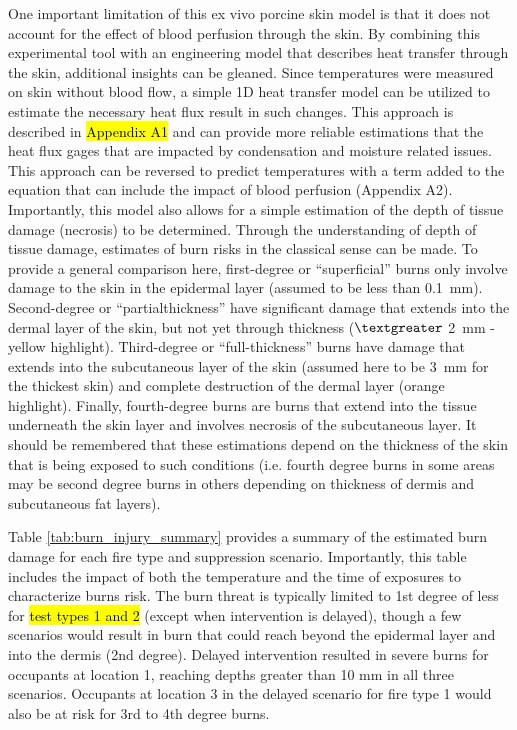 \documentclass[12pt,oneside]{book}
\begin{document}
One important limitation of this ex vivo porcine skin model is that it does not account for the effect of blood perfusion through the skin. By combining this experimental tool with an engineering model that describes heat transfer through the skin, additional insights can be gleaned.  Since temperatures were measured on skin without blood flow, a simple 1\-D heat transfer model can be utilized to estimate the necessary heat flux result in such changes.  This approach is described in \hl{Appendix A1} and can provide more reliable estimations that the heat flux gages that are impacted by condensation and moisture related issues.  This approach can be reversed to predict temperatures with a term added to the equation that can include the impact of blood perfusion (Appendix A2).  Importantly, this model also allows for a simple estimation of the depth of tissue damage (necrosis) to be determined.  Through the understanding of depth of tissue damage, estimates of burn risks in the classical sense can be made. To provide a general comparison here, first-degree or “superficial” burns only involve damage to the skin in the epidermal layer (assumed to be less than 0.1~mm). Second-degree or ``partial\-thickness'' have significant damage that extends into the dermal layer of the skin, but not yet through thickness ($\textgreater$ 2~mm - yellow highlight). Third-degree or ``full-thickness'' burns have damage that extends into the subcutaneous layer of the skin (assumed here to be 3~mm for the thickest skin) and complete destruction of the dermal layer (orange highlight). Finally, fourth-degree burns are burns that extend into the tissue underneath the skin layer and involves necrosis of the subcutaneous layer. It should be remembered that these estimations depend on the thickness of the skin that is being exposed to such conditions (i.e. fourth degree burns in some areas may be second degree burns in others depending on thickness of dermis and subcutaneous fat layers).

Table \ref{tab:burn_injury_summary} provides a summary of the estimated burn damage for each fire type and suppression scenario.  Importantly, this table includes the impact of both the temperature and the time of exposures to characterize burns risk.  The burn threat is typically limited to 1st degree of less for \hl{test types 1 and 2} (except when intervention is delayed), though a few scenarios would result in burn that could reach beyond the epidermal layer and into the dermis (2nd degree). Delayed intervention resulted in severe burns for occupants at location 1, reaching depths greater than 10 mm in all three scenarios.  Occupants at location 3 in the delayed scenario for fire type 1 would also be at risk for 3rd to 4th degree burns.
 
\end{document}
